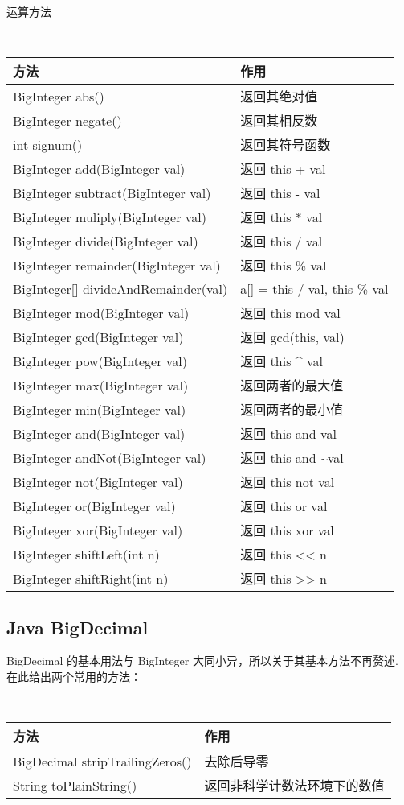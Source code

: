 运算方法
{\tt
    \begin{longtable}{|p{9.3cm}|p{6cm}|}
    \hline
    方法 & 作用 \\
    \hline
    BigInteger abs() & 返回其绝对值 \\
    \hline
    BigInteger negate() & 返回其相反数 \\
    \hline
    int signum() & 返回其符号函数 \\
    \hline
    BigInteger add(BigInteger val) & 返回 this + val \\
    \hline
    BigInteger subtract(BigInteger val) & 返回 this - val \\
    \hline
    BigInteger muliply(BigInteger val) & 返回 this * val \\
    \hline
    BigInteger divide(BigInteger val) & 返回 this / val \\
    \hline
    BigInteger remainder(BigInteger val) & 返回 this \% val \\
    \hline
    BigInteger[] divideAndRemainder(val) & a[] = this / val, this \% val \\
    \hline
    BigInteger mod(BigInteger val) & 返回 this mod val \\
    \hline
    BigInteger gcd(BigInteger val) & 返回 gcd(this, val) \\
    \hline
    BigInteger pow(BigInteger val) & 返回 this \^{} val \\
    \hline
    BigInteger max(BigInteger val) & 返回两者的最大值 \\
    \hline
    BigInteger min(BigInteger val) & 返回两者的最小值 \\
    \hline
    BigInteger and(BigInteger val) & 返回 this and val \\
    \hline
    BigInteger andNot(BigInteger val) & 返回 this and \~{}val \\
    \hline
    BigInteger not(BigInteger val) & 返回 this not val \\
    \hline
    BigInteger or(BigInteger val) & 返回 this or val \\
    \hline
    BigInteger xor(BigInteger val) & 返回 this xor val \\
    \hline
    BigInteger shiftLeft(int n) & 返回 this << n \\
    \hline
    BigInteger shiftRight(int n) & 返回 this >> n \\
    \hline
    \end{longtable}
}

    \subsection{Java BigDecimal}\small
BigDecimal 的基本用法与 BigInteger 大同小异，所以关于其基本方法不再赘述.
在此给出两个常用的方法：
{\tt
    \begin{longtable}{|p{9.3cm}|p{6cm}|}
    \hline
    方法 & 作用 \\
    \hline
    BigDecimal stripTrailingZeros() & 去除后导零 \\
    \hline
    String toPlainString() & 返回非科学计数法环境下的数值 \\
    \hline
    \end{longtable}
}


